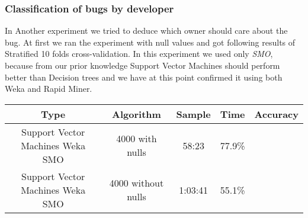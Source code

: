 \subsubsection{Classification of bugs by developer} %
\label{sub:Classification of bugs bugs by developer}
    In Another experiment we tried to deduce which owner should care about the bug.
    At first we ran the experiment with null values and got following results of Stratified 10 folds cross-validation.
    In this experiment we used only {\it SMO}, because from our prior knowledge Support Vector Machines
    should perform better than Decision trees and we have at this point confirmed it using both Weka and Rapid Miner.

    
\begin{tabular}{|c|c|c|c|c|}
\hline
Type     &       Algorithm   & Sample &  Time &  Accuracy   \\
\hline
\hline
Support Vector Machines   Weka SMO    & 4000  with nulls &   58:23 &    77.9\%  \\
Support Vector Machines   Weka SMO    & 4000  without nulls &  1:03:41 &    55.1\%  \\
\hline
\end{tabular}



